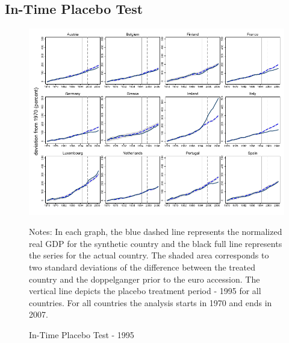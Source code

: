 \documentclass[12pt]{article}
\newcommand{\annote}[1]{\parbox{\textwidth}{\renewcommand{\baselinestretch}{1.0}\vspace{12pt} \small Notes: #1}}
\begin{document}
\begin{appendices}
\subsection{In-Time Placebo Test}
\begin{figure}[h!]
    \centering
    \caption{In-Time Placebo Test - 1995 \label{F_1995}}
    \includegraphics[scale=1]{Output/Figures/SCM_gdp_Rob_1995_Annual.pdf}
    \annote{In each graph, the blue dashed line represents the normalized real GDP for the synthetic country and the black full line represents the series for the actual country. The shaded area corresponds to two standard deviations of the difference between the treated country and the doppelganger prior to the euro accession. The vertical line depicts the placebo treatment period - 1995 for all countries. For all countries the analysis starts in 1970 and ends in 2007. 
    }
\end{figure}



\end{appendices}
\end{document}
